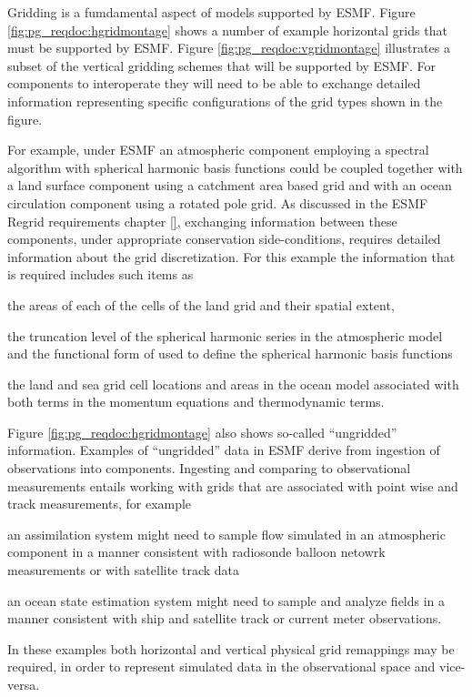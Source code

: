 Gridding is a fumdamental aspect of models supported by ESMF.
Figure \ref{fig:pg_reqdoc:hgridmontage} shows a number of example 
horizontal grids that must be supported by ESMF. 
Figure \ref{fig:pg_reqdoc:vgridmontage} illustrates a subset of the 
vertical gridding schemes that will be supported by ESMF.
For components to interoperate they will need to be able to exchange detailed 
information representing specific configurations of the grid types
shown in the figure.
 
 For example, under ESMF an atmospheric component employing a spectral
algorithm with spherical harmonic basis functions could be coupled
together with a land surface component using a catchment area based grid
and with an ocean circulation component using a rotated pole grid.
As discussed in the ESMF Regrid requirements chapter \ref{}, exchanging information 
between these components, under appropriate conservation side-conditions, requires 
detailed information about the grid discretization. For this example the
information that is required includes such items as
\begin{description}
\item the areas of each of the cells of the land grid and
their spatial extent, 

\item the truncation level of the spherical harmonic
series in the atmospheric model and the functional form of
used to define the spherical harmonic basis functions

\item the land and sea grid cell locations and areas in the ocean model
associated with both terms in the momentum equations and
thermodynamic terms.
\end{description}

Figure \ref{fig:pg_reqdoc:hgridmontage} also shows so-called ``ungridded''
information. Examples of ``ungridded'' data in ESMF derive from
ingestion of observations into components.
Ingesting and comparing to observational measurements entails
working with grids that are associated with point wise 
and track measurements, for example
\begin{description}
\item an assimilation system might need to
sample flow simulated in an atmospheric component in 
a manner consistent with radiosonde balloon netowrk measurements
or with satellite track data
\item an ocean state estimation system might need to sample and analyze
fields in a manner consistent with ship and satellite
track or current meter observations.
\end{description}
In these examples both horizontal and vertical physical grid remappings
may be required, in order to represent simulated data in the observational
space and vice-versa.

